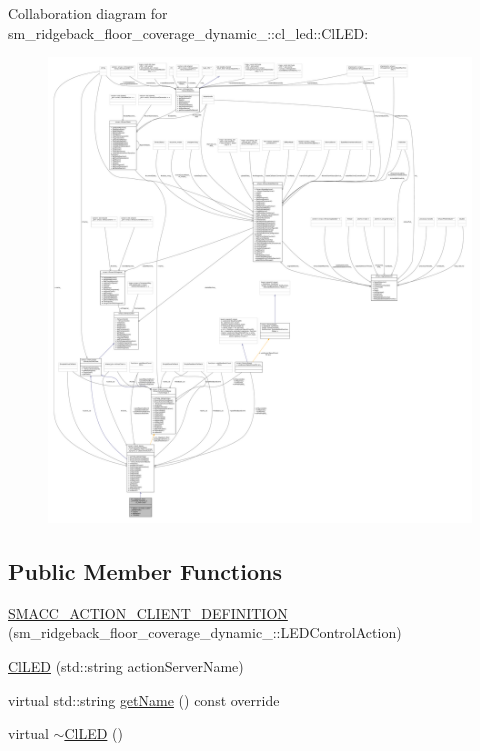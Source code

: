 Collaboration diagram for sm\+\_\+ridgeback\+\_\+floor\+\_\+coverage\+\_\+dynamic\+\_\+:\+:cl\+\_\+led\+:\+:Cl\+L\+ED\+:
\nopagebreak
\begin{figure}[H]
\begin{center}
\leavevmode
\includegraphics[width=350pt]{classsm__ridgeback__floor__coverage__dynamic__1_1_1cl__led_1_1ClLED__coll__graph}
\end{center}
\end{figure}
\subsection*{Public Member Functions}
\begin{DoxyCompactItemize}
\item 
\hyperlink{classsm__ridgeback__floor__coverage__dynamic__1_1_1cl__led_1_1ClLED_ab34fe87843822fca4b46d3293cd14ae3}{S\+M\+A\+C\+C\+\_\+\+A\+C\+T\+I\+O\+N\+\_\+\+C\+L\+I\+E\+N\+T\+\_\+\+D\+E\+F\+I\+N\+I\+T\+I\+ON} (sm\+\_\+ridgeback\+\_\+floor\+\_\+coverage\+\_\+dynamic\+\_\+::\+L\+E\+D\+Control\+Action)
\item 
\hyperlink{classsm__ridgeback__floor__coverage__dynamic__1_1_1cl__led_1_1ClLED_ac0b1fed031697c85de6697af385a0917}{Cl\+L\+ED} (std\+::string action\+Server\+Name)
\item 
virtual std\+::string \hyperlink{classsm__ridgeback__floor__coverage__dynamic__1_1_1cl__led_1_1ClLED_a0f000a65ef7ec3bb3255776434e95e63}{get\+Name} () const override
\item 
virtual \hyperlink{classsm__ridgeback__floor__coverage__dynamic__1_1_1cl__led_1_1ClLED_a66d6d0f853a8a3a84c00a94afd6e14c2}{$\sim$\+Cl\+L\+ED} ()
\end{DoxyCompactItemize}
